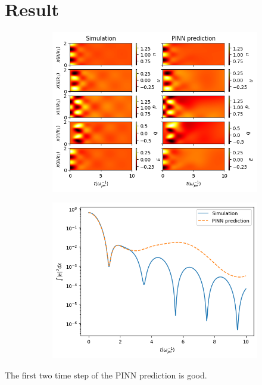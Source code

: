 \documentclass{article}
\begin{document}
    \section{Result}
    \begin{figure} [H]
        \centering
        \begin{subfigure}[b]{0.5\textwidth}
            \includegraphics[width=\textwidth]{img/fields.png}
        \end{subfigure}%
        \begin{subfigure}[b]{0.5\textwidth}
            \includegraphics[width=\textwidth]{img/energy.png}
        \end{subfigure}
    \end{figure}
    The first two time step of the PINN prediction is good.
\end{document}
